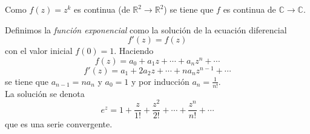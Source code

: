 \begin{obs}
  Como $f(z) = z^{k}$ es continua (de $\mathbb{R}^{2} \rightarrow \mathbb{R}^{2}$) se tiene que $f$ es continua de $\mathbb{C} \rightarrow \mathbb{C}$.
\end{obs}

\begin{defn}
Definimos la \textit{función exponencial} como la solución de la ecuación diferencial \[ f'(z) = f(z) \] con el valor inicial $ f(0) = 1$. Haciendo \[ f(z) = a_{0} + a_{1}z + \cdots + a_{n}z^{n} + \cdots \] \[ f'(z) = a_{1} + 2a_{2}z + \cdots + na_{n}z^{n-1} + \cdots  \] se tiene que $a_{n-1} = n a_{n}$ y $ a_{0} = 1$ y por inducción $a_{n}=\frac{1}{n!}$.
\\ La solución se denota \[ e^{z} = 1 + \frac{z}{1!} + \frac{z^{2}}{2!} + \cdots + \frac{z^{n}}{n!} + \cdots \] que es una serie convergente.
\end{defn}
